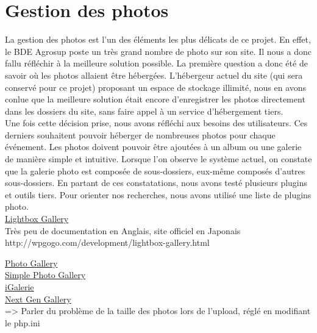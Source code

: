 \section*{Gestion des photos}
La gestion des photos est l'un des éléments les plus délicats de ce projet. En effet, le BDE Agrosup poste un très grand nombre de photo sur son site. Il nous a donc fallu réfléchir à la meilleure solution possible. La première question a donc été de savoir où les photos allaient être hébergées. L'hébergeur actuel du site (qui sera conservé pour ce projet) proposant un espace de stockage illimité, nous en avons conlue que la meilleure solution était encore d'enregistrer les photos directement dans les dossiers du site, sans faire appel à un service d'hébergement tiers.\\

Une fois cette décision prise, nous avons réfléchi aux besoins des utilisateurs. Ces derniers souhaitent pouvoir héberger de nombreuses photos pour chaque événement. Les photos doivent pouvoir être ajoutées à un album ou une galerie de manière simple et intuitive. Lorsque l'on observe le système actuel, on constate que la galerie photo est composée de sous-dossiers, eux-même composés d'autres sous-dossiers. En partant de ces constatations, nous avons testé plusieurs plugins et outils tiers. Pour orienter nos recherches, nous avons utilisé une liste de plugins photo\cite{listePlugins}.\\

\underline{Lightbox Gallery}\\
Très peu de documentation en Anglais, site officiel en Japonais\\
http://wpgogo.com/development/lightbox-gallery.html

\underline{Photo Gallery}\\
\underline{Simple Photo Gallery}\\
\underline{iGalerie}\\
\underline{Next Gen Gallery}\\

=> Parler du problème de la taille des photos lors de l'upload, réglé en modifiant le php.ini
